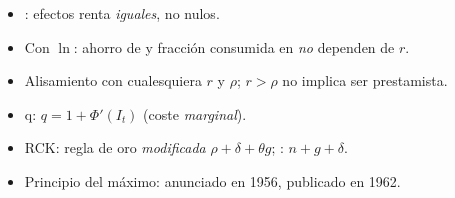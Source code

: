 \documentclass{article}
\begin{document}
\begin{columnas}
\begin{trampa}
\begin{itemize}
\item {}: efectos renta \emph{iguales}, no nulos.
\item Con $\ln$: ahorro de  y fracción consumida en  \emph{no} dependen de $r$.
\item Alisamiento con cualesquiera $r$ y $\rho$; $r>\rho$ no implica ser prestamista.
\item q: $q=1+\Phi'(I_t)$ (coste \emph{marginal}).
\item RCK: regla de oro \emph{modificada} $\rho+\delta+\theta g$; : $n+g+\delta$.
\item Principio del máximo: anunciado en 1956, publicado en 1962.
\end{itemize}
\end{trampa}

\end{columnas}
\end{document}
